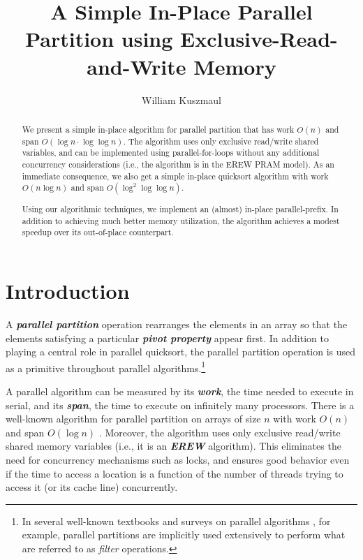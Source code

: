 \documentclass[sigplan, twocolumn]{amsart}
\newcommand{\defn}[1]       {{\textit{\textbf{\boldmath #1}}}}
\theoremstyle{remark}
\theoremstyle{remark}
\begin{document}
\title{A Simple In-Place Parallel Partition using Exclusive-Read-and-Write Memory}
\author{William Kuszmaul }
\maketitle


  \begin{abstract}
We present a simple in-place algorithm for parallel partition that has
work $O(n)$ and span $O(\log n \cdot \log \log n)$. The algorithm uses
only exclusive read/write shared variables, and can be implemented
using parallel-for-loops without any additional concurrency
considerations (i.e., the algorithm is in the EREW PRAM model). As an
immediate consequence, we also get a simple in-place quicksort
algorithm with work $O(n \log n)$ and span $O(\log^2 \log \log n)$.

Using our algorithmic techniques, we implement an (almost) in-place
parallel-prefix. In addition to achieving much better memory
utilization, the algorithm achieves a modest speedup over its
out-of-place counterpart.
 \end{abstract}

\section{Introduction}

A \defn{parallel partition} operation rearranges the elements in an
array so that the elements satisfying a particular \defn{pivot
  property} appear first. In addition to playing a central role in
parallel quicksort, the parallel partition operation is used as a
primitive throughout parallel algorithms.\footnote{In several
  well-known textbooks and surveys on parallel algorithms
  \cite{AcarBl16,Blelloch96}, for example, parallel partitions are
  implicitly used extensively to perform what are referred to as
  \emph{filter} operations.}

A parallel algorithm can be measured by its \defn{work}, the time
needed to execute in serial, and its \defn{span}, the time to execute
on infinitely many processors. There is a well-known algorithm for
parallel partition on arrays of size $n$ with work $O(n)$ and span
$O(\log n)$ \cite{Blelloch96,AcarBl16}. Moreover, the algorithm uses
only exclusive read/write shared memory variables (i.e., it is an
\defn{EREW} algorithm). This eliminates the need for concurrency
  mechanisms such as locks, and ensures good behavior even if the time
  to access a location is a function of the number of threads trying
  to access it (or its cache line) concurrently.
\end{document}
